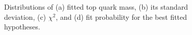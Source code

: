 \begin{figure}[!htp]
   \centering
   \hfill
   \caption[Kinematic distributions after the fit]{Distributions of (a) fitted top quark mass, (b) its standard
   deviation, (c) $\chi^{2}$, and (d) fit probability for the best fitted hypotheses.}
   \label{fig:fitplots}
\end{figure}

